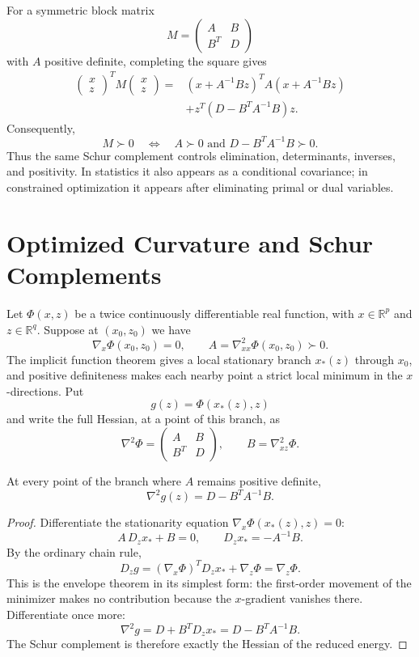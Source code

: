For a symmetric block matrix
\[
  M=\begin{pmatrix}A&B\\B^T&D\end{pmatrix}
\]
with \(A\) positive definite, completing the square gives
\[
\begin{aligned}
\begin{pmatrix}x\\z\end{pmatrix}^{T}
M
\begin{pmatrix}x\\z\end{pmatrix}
={}&
(x+A^{-1}Bz)^TA(x+A^{-1}Bz)\\
&+z^T(D-B^TA^{-1}B)z.
\end{aligned}
\]
Consequently,
\[
  M\succ0
  \quad\Longleftrightarrow\quad
  A\succ0
  \text{ and }
  D-B^TA^{-1}B\succ0.
\]
Thus the same Schur complement controls elimination, determinants, inverses, and positivity.  In statistics it also appears as a conditional covariance; in constrained optimization it appears after eliminating primal or dual variables.

\section{Optimized Curvature and Schur Complements}

Let $\Phi(x,z)$ be a twice continuously differentiable real function, with $x\in\mathbb R^p$ and $z\in\mathbb R^q$. Suppose at $(x_0,z_0)$ we have
\[
 \nabla_x\Phi(x_0,z_0)=0,\qquad
 A=\nabla_{xx}^2\Phi(x_0,z_0)\succ0.
\]
The implicit function theorem gives a local stationary branch $x_*(z)$ through $x_0$, and positive definiteness makes each nearby point a strict local minimum in the $x$-directions. Put
\[
 g(z)=\Phi(x_*(z),z)
\]
and write the full Hessian, at a point of this branch, as
\[
 \nabla^2\Phi=
 \begin{pmatrix}A&B\\B^T&D\end{pmatrix},
 \qquad B=\nabla^2_{xz}\Phi.
\]

\begin{theorem}
At every point of the branch where $A$ remains positive definite,
\[
 \boxed{\nabla^2g(z)=D-B^TA^{-1}B.}
\]
\end{theorem}

\begin{proof}
Differentiate the stationarity equation $\nabla_x\Phi(x_*(z),z)=0$:
\[
 A\,D_zx_*+B=0,
 \qquad D_zx_*=-A^{-1}B.
\]
By the ordinary chain rule,
\[
 D_zg=(\nabla_x\Phi)^TD_zx_*+\nabla_z\Phi=\nabla_z\Phi.
\]
This is the envelope theorem in its simplest form: the first-order movement of the minimizer makes no contribution because the $x$-gradient vanishes there. Differentiate once more:
\[
 \nabla^2g
 =D+B^TD_zx_*
 =D-B^TA^{-1}B.
\]
The Schur complement is therefore exactly the Hessian of the reduced energy.
\end{proof}


